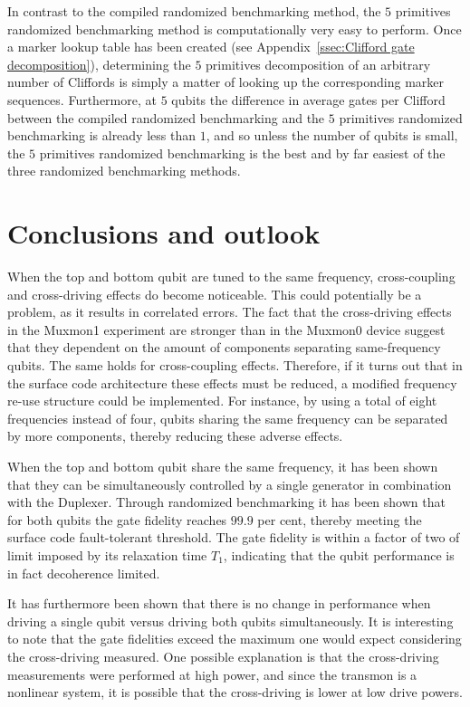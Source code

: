           In contrast to the compiled randomized benchmarking method, the $5$ primitives randomized benchmarking method is computationally very easy to perform. Once a marker lookup table has been created (see Appendix~\ref{ssec:Clifford gate decomposition}), determining the $5$ primitives decomposition of an arbitrary number of Cliffords is simply a matter of looking up the corresponding marker sequences. Furthermore, at $5$ qubits the difference in average gates per Clifford between the compiled randomized benchmarking and the $5$ primitives randomized benchmarking is already less than $1$, and so unless the number of qubits is small, the $5$ primitives randomized benchmarking is the best and by far easiest of the three randomized benchmarking methods.


  \chapter{Conclusions and outlook}

    When the top and bottom qubit are tuned to the same frequency, cross-coupling and cross-driving effects do become noticeable. This could potentially be a problem, as it results in correlated errors. The fact that the cross-driving effects in the Muxmon1 experiment are stronger than in the Muxmon0 device suggest that they dependent on the amount of components separating same-frequency qubits. The same holds for cross-coupling effects. Therefore, if it turns out that in the surface code architecture these effects must be reduced, a modified frequency re-use structure could be implemented. For instance, by using a total of eight frequencies instead of four, qubits sharing the same frequency can be separated by more components, thereby reducing these adverse effects.

    When the top and bottom qubit share the same frequency, it has been shown that they can be simultaneously controlled by a single generator in combination with the Duplexer. Through randomized benchmarking it has been shown that for both qubits the gate fidelity reaches $99.9$ per cent, thereby meeting the surface code fault-tolerant threshold. The gate fidelity is within a factor of two of limit imposed by its relaxation time $T_1$, indicating that the qubit performance is in fact decoherence limited.

    It has furthermore been shown that there is no change in performance when driving a single qubit versus driving both qubits simultaneously. It is interesting to note that the gate fidelities exceed the maximum one would expect considering the cross-driving measured. One possible explanation is that the cross-driving measurements were performed at high power, and since the transmon is a nonlinear system, it is possible that the cross-driving is lower at low drive powers.

